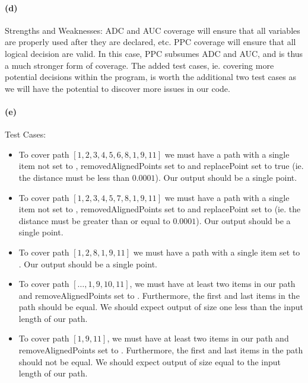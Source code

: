 \documentclass[12pt]{article}
\begin{document}
\paragraph{(d)} Strengths and Weaknesses: ADC and AUC coverage will ensure that all variables are properly used after they are declared, etc. PPC coverage will ensure that all logical decision are valid. In this case, PPC subsumes ADC and AUC, and is thus a much stronger form of coverage. The added test cases, ie. covering more potential decisions within the program, is worth the additional two test cases as we will have the potential to discover more issues in our code.

\paragraph{(e)} Test Cases:
\begin{itemize}
\item To cover path $[1, 2, 3, 4, 5, 6, 8, 1, 9, 11]$ we must have a path with a single item not set to \rmfamily{}, removedAlignedPoints set to \rmfamily{} and replacePoint set to true (ie. the distance must be less than $0.0001$). Our output should be a single point.
\item To cover path $[1, 2, 3, 4, 5, 7, 8, 1, 9, 11]$ we must have a path with a single item not set to \rmfamily{}, removedAlignedPoints set to \rmfamily{} and replacePoint set to \rmfamily{} (ie. the distance must be greater than or equal to $0.0001$). Our output should be a single point.
\item To cover path $[1, 2, 8, 1, 9, 11]$ we must have a path with a single item set to \rmfamily{}. Our output should be a single point.
\item To cover path $[\dots, 1, 9, 10, 11]$, we must have at least two items in our path and removeAlignedPoints set to \rmfamily{}. Furthermore, the first and last items in the path should be equal. We should expect output of size one less than the input length of our path.
\item To cover path $[1, 9, 11]$, we must have at least two items in our path and removeAlignedPoints set to \rmfamily{}. Furthermore, the first and last items in the path should not be equal. We should expect output of size equal to the input length of our path.
\end{itemize}
\end{document}
